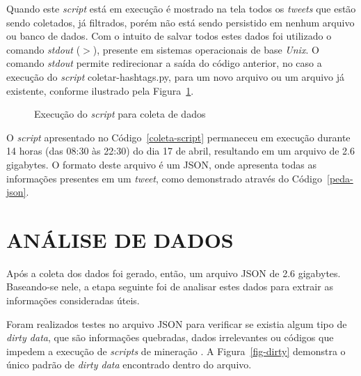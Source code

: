 Quando este \textit{script} está em execução é mostrado na tela todos os \textit{tweets} que estão sendo coletados, já filtrados, porém não está sendo persistido em nenhum arquivo ou banco de dados. Com o intuito de salvar todos estes dados foi utilizado o comando \textit{stdout} ($>$), presente em sistemas operacionais de base \textit{Unix}. O comando \textit{stdout} permite redirecionar a saída do código anterior, no caso a execução do \textit{script} coletar-hashtags.py, para um novo arquivo ou um arquivo já existente, conforme ilustrado pela Figura~\ref{exec-coleta}.

\begin{figure}[h]
	\centering
	\caption{Execução do \textit{script} para coleta de dados}
	\vspace{-0.3cm}
	\label{exec-coleta}
\end{figure}

O \textit{script} apresentado no Código~\ref{coleta-script} permaneceu em execução durante 14 horas (das 08:30 às 22:30) do dia 17 de abril, resultando em um arquivo de 2.6 gigabytes. O formato deste arquivo é um JSON, onde apresenta todas as informações presentes em um \textit{tweet}, como demonstrado através do Código~\ref{peda-json}.



\section{ANÁLISE DE DADOS}
Após a coleta dos dados foi gerado, então, um arquivo JSON de 2.6 gigabytes. Baseando-se nele, a etapa seguinte foi de analisar estes dados para extrair as informações consideradas úteis.

Foram realizados testes no arquivo JSON para verificar se existia algum tipo de \textit{dirty data}, que são informações quebradas, dados irrelevantes ou códigos que impedem a execução de \textit{scripts} de mineração \cite{dirty-data}. A Figura~\ref{fig-dirty} demonstra o único padrão de \textit{dirty data} encontrado dentro do arquivo.

